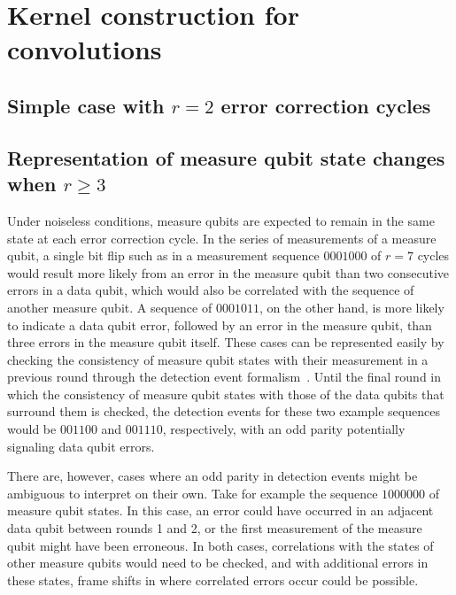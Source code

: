 \section{Kernel construction for convolutions}

\subsection{Simple case with $r=2$ error correction cycles}

\subsection{Representation of measure qubit state changes when $r\geq 3$}

Under noiseless conditions, measure qubits are expected to remain in the same state at each error correction cycle.
In the series of measurements of a measure qubit, a single bit flip such as in a measurement sequence $0001000$ of $r=7$ cycles would result more likely from an error in the measure qubit than two consecutive errors in a data qubit, which would also be correlated with the sequence of another measure qubit. A sequence of $0001011$, on the other hand, is more likely to indicate a data qubit error, followed by an error in the measure qubit, than three errors in the measure qubit itself. These cases can be represented easily by checking the consistency of measure qubit states with their measurement in a previous round through the detection event formalism~\cite{Gidney:2021,Higgott:2023}. Until the final round in which the consistency of measure qubit states with those of the data qubits that surround them is checked, the detection events for these two example sequences would be $001100$ and $001110$, respectively, with an odd parity potentially signaling data qubit errors.

There are, however, cases where an odd parity in detection events might be ambiguous to interpret on their own. Take for example the sequence $1000000$ of measure qubit states. In this case, an error could have occurred in an adjacent data qubit between rounds 1 and 2, or the first measurement of the measure qubit might have been erroneous. In both cases, correlations with the states of other measure qubits would need to be checked, and with additional errors in these states, frame shifts in where correlated errors occur could be possible.

